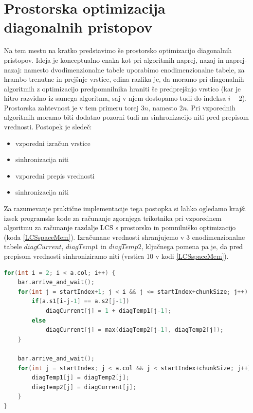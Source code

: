 \documentclass[a4paper,12pt,openright]{book}
\begin{document}
\section{Prostorska optimizacija diagonalnih pristopov}

Na tem mestu na kratko predstavimo še prostorsko optimizacijo diagonalnih pristopov. Ideja je konceptualno enaka kot pri algoritmih naprej, nazaj in naprej-nazaj: namesto dvodimenzionalne tabele uporabimo enodimenzionalne tabele, za hrambo trenutne in prejšnje vrstice, edina razlika je, da moramo pri diagonalnih algoritmih z optimizacijo predpomnilnika hraniti še predprejšnjo vrstico (kar je hitro razvidno iz samega algoritma, saj v njem dostopamo tudi do indeksa $i-2$). Prostorska zahtevnost je v tem primeru torej $3n$, namesto $2n$. Pri vzporednih algoritmih moramo biti dodatno pozorni tudi na sinhronizacijo niti pred prepisom vrednosti. Postopek je sledeč:
\begin{itemize}
\item vzporedni izračun vrstice
\item sinhronizacija niti
\item vzporedni prepis vrednosti
\item sinhronizacija niti
\end{itemize}

Za razumevanje praktične implementacije tega postopka si lahko ogledamo krajši izsek programske kode za računanje zgornjega trikotnika pri vzporednem algoritmu za računanje razdalje LCS s prostorsko in pomnilniško optimizacijo (koda \ref{LCSspaceMem}). Izračunane vrednosti shranjujemo v 3 enodimenzionalne tabele $diagCurrent$, $diagTemp1$ in $diagTemp2$, ključnega pomena pa je, da pred prepisom vrednosti sinhroniziramo niti (vrstica 10 v kodi \ref{LCSspaceMem}). 

\bigskip
\bigskip
\begin{lstlisting}[language=C++, caption={Del kode za računanje razdalje LCS s prostorsko in pomnilniško optimizacijo}, captionpos=b, label=LCSspaceMem]
for(int i = 2; i < a.col; i++) {
    bar.arrive_and_wait();
    for(int j = startIndex+1; j < i && j <= startIndex+chunkSize; j++) {
        if(a.s1[i-j-1] == a.s2[j-1])
            diagCurrent[j] = 1 + diagTemp1[j-1];
        else
            diagCurrent[j] = max(diagTemp2[j-1], diagTemp2[j]);
    }
    
    bar.arrive_and_wait();
    for(int j = startIndex; j < a.col && j < startIndex+chunkSize; j++) {
        diagTemp1[j] = diagTemp2[j];
        diagTemp2[j] = diagCurrent[j];
    }
}
\end{lstlisting}
    
\end{document}
